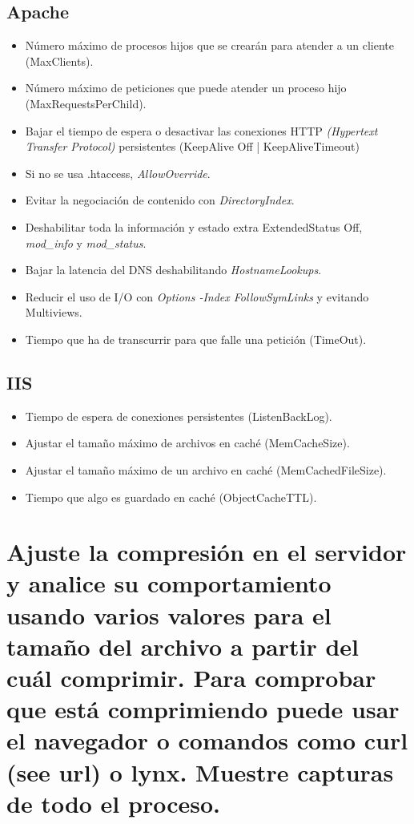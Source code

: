 \subsection{Apache}
\begin{itemize}
	\item Número máximo de procesos hijos que se crearán para atender a un cliente (MaxClients).
	\item Número máximo de peticiones que puede atender un proceso hijo (MaxRequestsPerChild).
	\item Bajar el tiempo de espera o desactivar las conexiones HTTP \textit{(Hypertext Transfer Protocol)} persistentes (KeepAlive Off | KeepAliveTimeout)
	\item Si no se usa .htaccess, \textit{AllowOverride}.
	\item Evitar la negociación de contenido con \textit{DirectoryIndex}.
	\item Deshabilitar toda la información y estado extra ExtendedStatus Off, \textit{mod\_info} y \textit{mod\_status}.
	\item Bajar la latencia del DNS deshabilitando \textit{HostnameLookups}.
	\item Reducir el uso de I/O con \textit{Options -Index FollowSymLinks} y evitando Multiviews.
	\item Tiempo que ha de transcurrir para que falle una petición (TimeOut).
\end{itemize}
\subsection{IIS}
\begin{itemize}
	\item Tiempo de espera de conexiones persistentes (ListenBackLog).
	\item Ajustar el tamaño máximo de archivos en caché (MemCacheSize).
	\item Ajustar el tamaño máximo de un archivo en caché (MemCachedFileSize).
	\item Tiempo que algo es guardado en caché (ObjectCacheTTL).
\end{itemize}
\section{Ajuste la compresión en el servidor y analice su comportamiento usando varios valores para el tamaño del archivo a partir del cuál comprimir. Para comprobar que está comprimiendo puede usar el navegador o comandos como curl (see url) o lynx. Muestre capturas de todo el proceso.}

